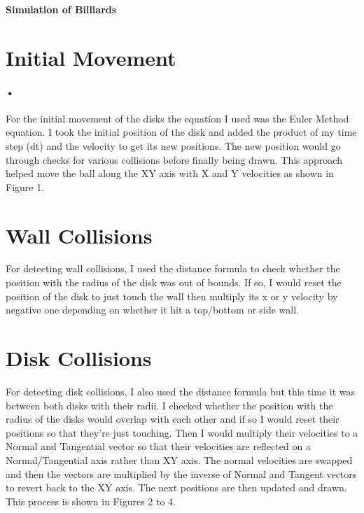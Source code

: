 \documentclass[12pt]{article}
\begin{document}
\centerline{\Large\textbf{Simulation of Billiards}}
\vspace{2cm}


\section{Initial Movement}\label{sec::Intro}
\paragraph{•} 
For the initial movement of the disks the equation I used was the Euler Method equation. I took the initial position of the disk and added the product of my time step (dt) and the velocity to get its new positions. The new position would go through checks for various collisions before finally being drawn. This approach helped move the ball along the XY axis with X and Y velocities as shown in Figure 1. 

\section{Wall Collisions}
For detecting wall collisions, I used the distance formula to check whether the position with the radius of the disk was out of bounds. If so, I would reset the position of the disk to just touch the wall then multiply its x or y velocity by negative one depending on whether it hit a top/bottom or side wall.

\section{Disk Collisions}

For detecting disk collisions, I also used the distance formula but this time it was between both disks with their radii. I checked whether the position with the radius of the disks would overlap with each other and if so I would reset their positions so that they're just touching. Then I would multiply their velocities to a Normal and Tangential vector so that their velocities are reflected on a Normal/Tangential axis rather than XY axis. The normal velocities are swapped and then the vectors are multiplied by the inverse of Normal and Tangent vectors to revert back to the XY axis. The next positions are then updated and drawn. This process is shown in Figures 2 to 4.
\end{document}
